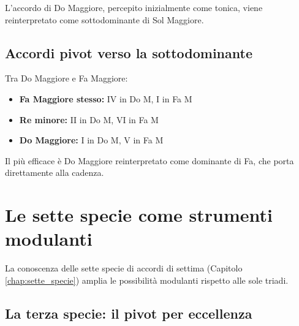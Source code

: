\begin{esempio}[Modulazione Do Maggiore $\rightarrow$ Sol Maggiore tramite pivot I = IV]
	\label{ex:mod_do_sol}

	L'accordo di Do Maggiore, percepito inizialmente come tonica, viene reinterpretato come sottodominante di Sol Maggiore.
\end{esempio}

\subsection{Accordi pivot verso la sottodominante}
\label{subsec:pivot_sottodominante}

\begin{regola}
	\label{reg:pivot_sottodominante}
	Tra Do Maggiore e Fa Maggiore:
	
	\begin{itemize}
		\item \textbf{Fa Maggiore stesso:} IV in Do M, I in Fa M
		\item \textbf{Re minore:} II in Do M, VI in Fa M
		\item \textbf{Do Maggiore:} I in Do M, V in Fa M
	\end{itemize}
	
	Il più efficace è Do Maggiore reinterpretato come dominante di Fa, che porta direttamente alla cadenza.
\end{regola}

\begin{esempio}[Modulazione Do Maggiore $\rightarrow$ Fa Maggiore tramite pivot I = V]
	\label{ex:mod_do_fa}
	
\end{esempio}

\section{Le sette specie come strumenti modulanti}
\label{sec:specie_modulazione}

La conoscenza delle sette specie di accordi di settima (Capitolo \ref{chap:sette_specie}) amplia le possibilità modulanti rispetto alle sole triadi.

\subsection{La terza specie: il pivot per eccellenza}
\label{subsec:seconda_specie_pivot}

